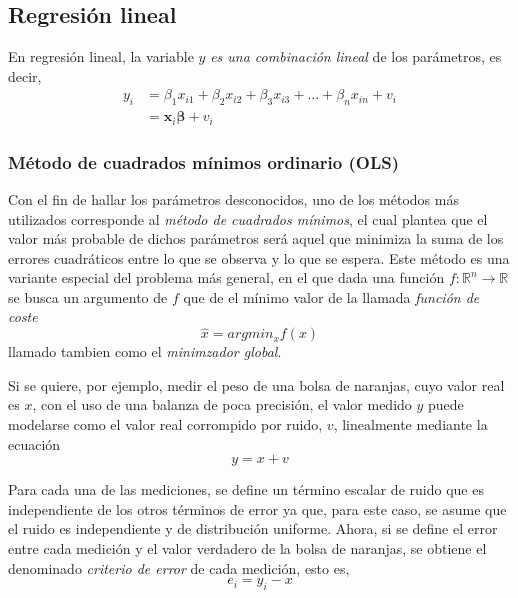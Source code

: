 \subsection{Regresión lineal}
En regresión lineal, la variable $y$ \textit{es una combinación lineal} de los parámetros, es decir,
\begin{align}
    y_i &= \beta_1 x_{i1} + \beta_2 x_{i2} + \beta_3 x_{i3} + ... + \beta_n x_{in} + v_i \\
      &= \bm{x}_i \bm{\beta} + v_i
\end{align}

\subsubsection{Método de cuadrados mínimos ordinario (OLS)}
Con el fin de hallar los parámetros desconocidos, uno de los métodos más utilizados corresponde al \textit{método de cuadrados mínimos}, el cual plantea que el valor más probable de dichos parámetros será aquel que minimiza la suma de los errores cuadráticos entre lo que se observa y lo que se espera. Este método es una variante especial del problema más general, en el que dada una función $f:\mathbb{R}^n\rightarrow\mathbb{R}$ se busca un argumento de $f$ que de el mínimo valor de la llamada \textit{función de coste}
\begin{equation}
    \hat{x} = argmin_x f(x)
    \label{eq:globalminimizer}
\end{equation}
llamado tambien como el \textit{minimzador global}.

Si se quiere, por ejemplo, medir el peso de una bolsa de naranjas, cuyo valor real es $x$, con el uso de una balanza de poca precisión, el valor medido $y$ puede modelarse como el valor real corrompido por ruido, $v$, linealmente mediante la ecuación
\begin{equation}
    y = x + v
    \label{eq:linearmeasmodel}
\end{equation}

Para cada una de las mediciones, se define un término escalar de ruido que es independiente de los otros términos de error ya que, para este caso, se asume que el ruido es independiente y de distribución uniforme. Ahora, si se define el error entre cada medición y el valor verdadero de la bolsa de naranjas, se obtiene el denominado \textit{criterio de error} de cada medición, esto es,
\begin{equation}
    e_i = y_i - x
\end{equation}


